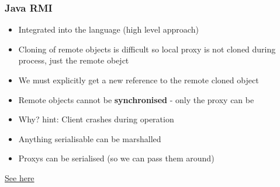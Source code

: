 \documentclass{beamer}
\begin{document}
      \begin{frame}
      	\frametitle{Java RMI}
      	\begin{itemize}
      		\item Integrated into the language (high level approach)
      		\item Cloning of remote objects is difficult so local proxy is not cloned during process, just the remote obejct
      		\item We must explicitly get a new reference to the remote cloned object
      		\item Remote objects cannot be \textbf{synchronised} - only the proxy can be
      		\item Why? hint: Client crashes during operation
      		\item Anything serialisable can be marshalled
      		\item Proxys can be serialised (so we can pass them around)
      	\end{itemize}
      	\href{https://www.mkyong.com/java/java-rmi-hello-world-example/}{See here}
      \end{frame}          
\end{document}
